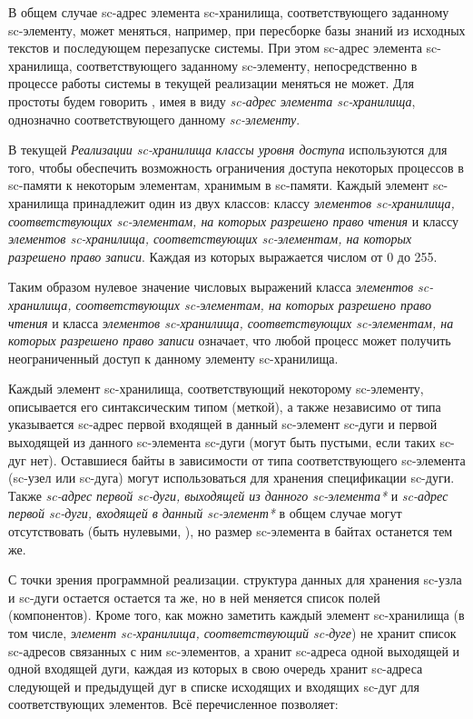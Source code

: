 В общем случае sc-адрес элемента sc-хранилища, соответствующего заданному sc-элементу, может меняться, например, при пересборке базы знаний из исходных текстов и последующем перезапуске системы. При этом sc-адрес элемента sc-хранилища, соответствующего заданному sc-элементу, непосредственно в процессе работы системы в текущей реализации меняться не может. Для простоты будем говорить , имея в виду \textit{sc-адрес} \textit{элемента sc-хранилища}, однозначно соответствующего данному \textit{sc-элементу}.

В текущей \textit{Реализации sc-хранилища} \textit{классы уровня доступа} используются для того, чтобы обеспечить возможность ограничения доступа некоторых процессов в sc-памяти к некоторым элементам, хранимым в sc-памяти. Каждый элемент sc-хранилища принадлежит один из двух классов: классу \textit{элементов sc-хранилища, соответствующих sc-элементам, на которых разрешено право чтения} и классу \textit{элементов sc-хранилища, соответствующих sc-элементам, на которых разрешено право записи}. Каждая из которых выражается числом от 0 до 255.


Таким образом нулевое значение числовых выражений класса \textit{элементов sc-хранилища, соответствующих sc-элементам, на которых разрешено право чтения} и класса \textit{элементов sc-хранилища, соответствующих sc-элементам, на которых разрешено право записи} означает, что любой процесс может получить неограниченный доступ к данному элементу sc-хранилища.


Каждый элемент sc-хранилища, соответствующий некоторому sc-элементу, описывается его синтаксическим типом (меткой), а также независимо от типа указывается sc-адрес первой входящей в данный sc-элемент sc-дуги и первой выходящей из данного sc-элемента sc-дуги (могут быть пустыми, если таких sc-дуг нет). Оставшиеся байты в зависимости от типа соответствующего sc-элемента (sc-узел или sc-дуга) могут использоваться для хранения спецификации sc-дуги. Также \textit{sc-адрес первой sc-дуги, выходящей из данного sc-элемента*} и \textit{sc-адрес первой sc-дуги, входящей в данный sc-элемент*} в общем случае могут отсутствовать (быть нулевыми, ), но размер sc-элемента в байтах останется тем же.


С точки зрения программной реализации. структура данных для хранения sc-узла и sc-дуги остается остается та же, но в ней меняется список полей (компонентов). Кроме того, как можно заметить каждый элемент sc-хранилища (в том числе, \textit{элемент sc-хранилища, соответствующий sc-дуге}) не хранит список sc-адресов связанных с ним sc-элементов, а хранит sc-адреса одной выходящей и одной входящей дуги, каждая из которых в свою очередь хранит sc-адреса следующей и предыдущей дуг в списке исходящих и входящих sc-дуг для соответствующих элементов. Всё перечисленное позволяет:

